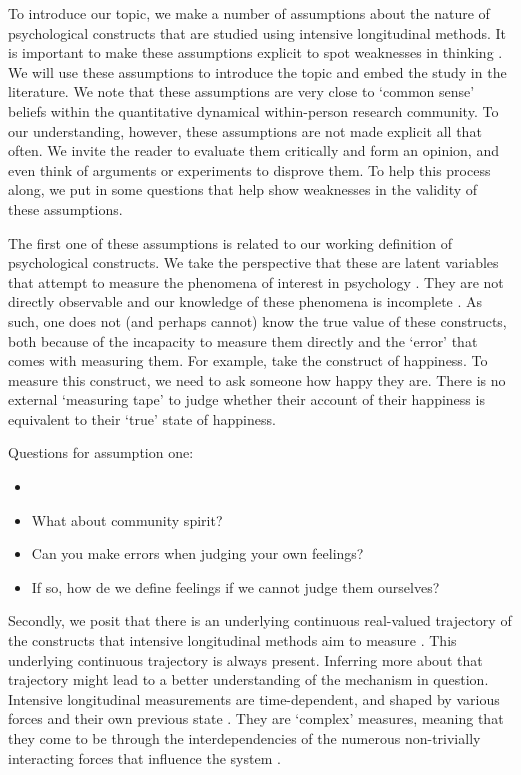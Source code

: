 \documentclass[utf8]{FrontiersinVancouver}
\begin{document}
To introduce our topic, we make a number of assumptions about the nature of psychological constructs that are studied using intensive longitudinal methods. It is important to make these assumptions explicit to spot weaknesses in thinking \citep{meehlTheoreticalRisksTabular2004}. We will use these assumptions to introduce the topic and embed the study in the literature. We note that these assumptions are very close to `common sense' beliefs within the quantitative dynamical within-person research community. To our understanding, however, these assumptions are not made explicit all that often. We invite the reader to evaluate them critically and form an opinion, and even think of arguments or experiments to disprove them. To help this process along, we put in some questions that help show weaknesses in the validity of these assumptions. 

The first one of these assumptions is related to our working definition of psychological constructs. We take the perspective that these are latent variables that attempt to measure the phenomena of interest in psychology \citep{borsboomLatentVariableTheory2008}. They are not directly observable and our knowledge of these phenomena is incomplete \citep{friedWhatArePsychological2017, maraunAugustinianMethodologicalFamily2009}. As such, one does not (and perhaps cannot) know the true value of these constructs, both because of the incapacity to measure them directly and the `error' that comes with measuring them. For example, take the construct of happiness. To measure this construct, we need to ask someone how happy they are. There is no external `measuring tape' to judge whether their account of their happiness is equivalent to their `true' state of happiness.

\begin{framed} 
    Questions for assumption one:
    \begin{itemize}
        \item 
        \item What about community spirit?
        \item Can you make errors when judging your own feelings?
        \item If so, how de we define feelings if we cannot judge them ourselves?
    \end{itemize}
\end{framed}

Secondly, we posit that there is an underlying continuous real-valued trajectory of the constructs that intensive longitudinal methods aim to measure \citep{hamakerNoTimePresent2017}. This underlying continuous trajectory is always present. Inferring more about that trajectory might lead to a better understanding of the mechanism in question. Intensive longitudinal measurements are time-dependent, and shaped by various forces and their own previous state \citep{olthofComplexityPsychologicalSelfratings2020b}. They are `complex' measures, meaning that they come to be through the interdependencies of the numerous non-trivially interacting forces that influence the system \citep{olthofComplexityTheoryPsychopathology2023}. 
\end{document}
